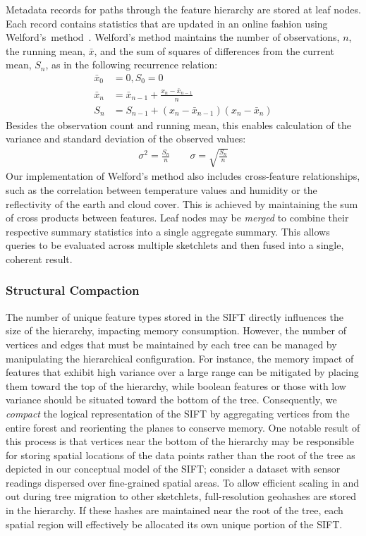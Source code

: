 Metadata records for paths through the feature hierarchy are stored at leaf nodes. Each record contains statistics that are updated in an online fashion using Welford's~method~\cite{welford1962note}. Welford's method maintains the number of observations, $n$, the running mean, $\bar{x}$, and the sum of squares of differences from the current mean, $S_n$, as in the following recurrence relation:
\begin{align*}
    \bar{x}_0 &= 0, S_0 = 0 \\
    \bar{x}_n &= \bar{x}_{n - 1} + \frac{x_n - \bar{x}_{n - 1}}{n} \\
    S_n       &= S_{n - 1} + (x_n - \bar{x}_{n - 1})(x_n - \bar{x}_n)
\end{align*}
Besides the observation count and running mean, this enables calculation of the variance and standard deviation of the observed values:
\begin{align*}
    \sigma^2 = \frac{S_n}{n} \hspace{2em} \sigma = \sqrt{\frac{S_n}{n}}
\end{align*}
Our implementation of Welford's method also includes cross-feature relationships, such as the correlation between temperature values and humidity or the reflectivity of the earth and cloud cover. This is achieved by maintaining the sum of cross products between features. Leaf nodes may be \emph{merged} to combine their respective summary statistics into a single aggregate summary. This allows queries to be evaluated across multiple sketchlets and then fused into a single, coherent result.

\subsubsection{Structural Compaction}
The number of unique feature types stored in the SIFT directly influences the size of the hierarchy, impacting memory consumption. However, the number of vertices and edges that must be maintained by each tree can be managed by manipulating the hierarchical configuration. For instance, the memory impact of features that exhibit high variance over a large range can be mitigated by placing them toward the top of the hierarchy, while boolean features or those with low variance should be situated toward the bottom of the tree. Consequently, we \emph{compact} the logical representation of the SIFT by aggregating vertices from the entire forest and reorienting the planes to conserve memory. One notable result of this process is that vertices near the bottom of the hierarchy may be responsible for storing spatial locations of the data points rather than the root of the tree as depicted in our conceptual model of the SIFT; consider a dataset with sensor readings dispersed over fine-grained spatial areas. To allow efficient scaling in and out during tree migration to other sketchlets, full-resolution geohashes are stored in the hierarchy. If these hashes are maintained near the root of the tree, each spatial region will effectively be allocated its own unique portion of the SIFT. 

